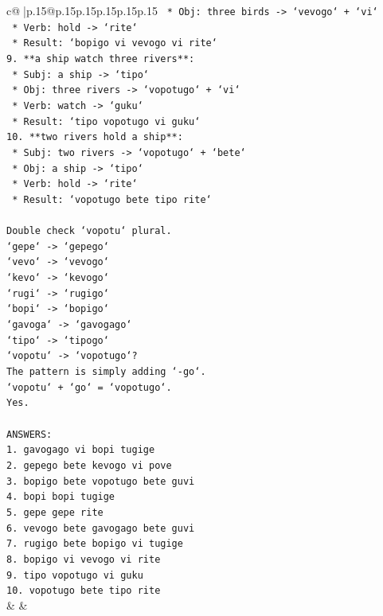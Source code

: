 \documentclass{article}
\begin{document}
{\begin{supertabular}{c@{$\;$}|p{.15\linewidth}@{}p{.15\linewidth}p{.15\linewidth}p{.15\linewidth}p{.15\linewidth}p{.15\linewidth}}
{{{\texttt{    *   Obj: three birds {-}> `vevogo` + `vi`} \\
\texttt{    *   Verb: hold {-}> `rite`} \\
\texttt{    *   Result: `bopigo vi vevogo vi rite`} \\
\texttt{9.  **a ship watch three rivers**:} \\
\texttt{    *   Subj: a ship {-}> `tipo`} \\
\texttt{    *   Obj: three rivers {-}> `vopotugo` + `vi`} \\
\texttt{    *   Verb: watch {-}> `guku`} \\
\texttt{    *   Result: `tipo vopotugo vi guku`} \\
\texttt{10. **two rivers hold a ship**:} \\
\texttt{    *   Subj: two rivers {-}> `vopotugo` + `bete`} \\
\texttt{    *   Obj: a ship {-}> `tipo`} \\
\texttt{    *   Verb: hold {-}> `rite`} \\
\texttt{    *   Result: `vopotugo bete tipo rite`} \\
\\ 
\texttt{Double check `vopotu` plural.} \\
\texttt{`gepe` {-}> `gepego`} \\
\texttt{`vevo` {-}> `vevogo`} \\
\texttt{`kevo` {-}> `kevogo`} \\
\texttt{`rugi` {-}> `rugigo`} \\
\texttt{`bopi` {-}> `bopigo`} \\
\texttt{`gavoga` {-}> `gavogago`} \\
\texttt{`tipo` {-}> `tipogo`} \\
\texttt{`vopotu` {-}> `vopotugo`?} \\
\texttt{The pattern is simply adding `{-}go`.} \\
\texttt{`vopotu` + `go` = `vopotugo`.} \\
\texttt{Yes.} \\
\\ 
\texttt{ANSWERS:} \\
\texttt{1. gavogago vi bopi tugige} \\
\texttt{2. gepego bete kevogo vi pove} \\
\texttt{3. bopigo bete vopotugo bete guvi} \\
\texttt{4. bopi bopi tugige} \\
\texttt{5. gepe gepe rite} \\
\texttt{6. vevogo bete gavogago bete guvi} \\
\texttt{7. rugigo bete bopigo vi tugige} \\
\texttt{8. bopigo vi vevogo vi rite} \\
\texttt{9. tipo vopotugo vi guku} \\
\texttt{10. vopotugo bete tipo rite} \\
            }
        }
    }
    & & \\ \\


\end{supertabular}}
\end{document}
